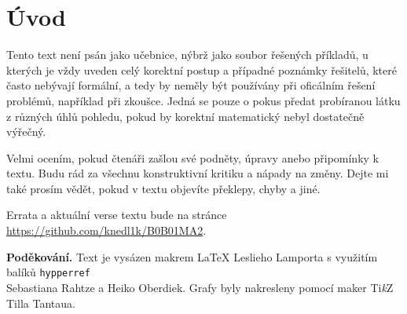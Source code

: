 \section*{Úvod}

\hspace{0.8cm} Tento text není psán jako učebnice, nýbrž jako soubor řešených příkladů, u kterých je vždy uveden celý 
korektní postup a případné poznámky řešitelů, které často nebývají formální, a tedy by neměly být používány při oficálním 
řešení problémů, například při zkoušce. Jedná se pouze o pokus předat probíranou látku z různých úhlů pohledu, pokud by 
korektní matematický nebyl dostatečně výřečný.

\hspace{0.8cm} Velmi ocením, pokud čtenáři zašlou své podněty, úpravy anebo připomínky k textu. Budu rád za všechnu 
konstruktivní kritiku a nápady na změny. Dejte mi také prosím vědět, pokud v textu objevíte překlepy, chyby a jiné.

Errata a aktuální verse textu bude na stránce \url{https://github.com/knedl1k/B0B01MA2}.

\textbf{Poděkování.} Text je vysázen makrem \LaTeX{} Leslieho Lamporta s využitím balíků \texttt{hypperref} \\ 
Sebastiana Rahtze a Heiko Oberdiek. Grafy byly nakresleny pomocí maker Ti\textit{k}Z Tilla Tantaua.